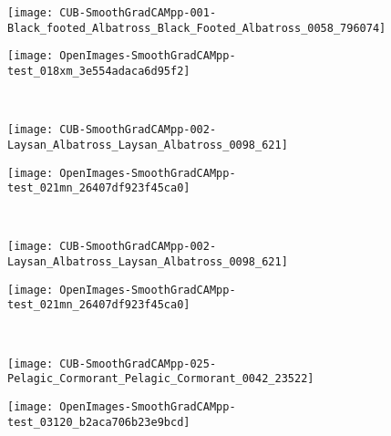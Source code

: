 \documentclass[twocolumn]{article}
\theoremstyle{definition}
\begin{document}
\begin{figure*}
     \centering
     \begin{subfigure}[b]{0.49\textwidth}
         \centering
         \texttt{[image: CUB-SmoothGradCAMpp-001-Black\_footed\_Albatross\_Black\_Footed\_Albatross\_0058\_796074]}
     \end{subfigure}
     \hfill
     \begin{subfigure}[b]{0.49\textwidth}
         \centering
         \texttt{[image: OpenImages-SmoothGradCAMpp-test\_018xm\_3e554adaca6d95f2]}
     \end{subfigure}
     \\
     \vspace{0.1cm}
     \begin{subfigure}[b]{0.49\textwidth}
         \centering
         \texttt{[image: CUB-SmoothGradCAMpp-002-Laysan\_Albatross\_Laysan\_Albatross\_0098\_621]}
     \end{subfigure}
     \hfill
     \begin{subfigure}[b]{0.49\textwidth}
         \centering
         \texttt{[image: OpenImages-SmoothGradCAMpp-test\_021mn\_26407df923f45ca0]}
     \end{subfigure}
     \\
     \vspace{0.1cm}
     \begin{subfigure}[b]{0.49\textwidth}
         \centering
         \texttt{[image: CUB-SmoothGradCAMpp-002-Laysan\_Albatross\_Laysan\_Albatross\_0098\_621]}
     \end{subfigure}
     \hfill
     \begin{subfigure}[b]{0.49\textwidth}
         \centering
         \texttt{[image: OpenImages-SmoothGradCAMpp-test\_021mn\_26407df923f45ca0]}
     \end{subfigure}
     \\
     \vspace{0.1cm}
     \begin{subfigure}[b]{0.49\textwidth}
         \centering
         \texttt{[image: CUB-SmoothGradCAMpp-025-Pelagic\_Cormorant\_Pelagic\_Cormorant\_0042\_23522]}
     \end{subfigure}
     \hfill
     \begin{subfigure}[b]{0.49\textwidth}
         \centering
         \texttt{[image: OpenImages-SmoothGradCAMpp-test\_03120\_b2aca706b23e9bcd]}
     \end{subfigure}
     \\

\end{figure*}
\end{document}
